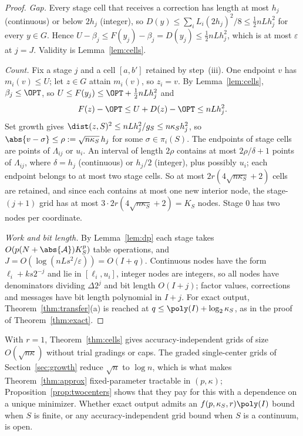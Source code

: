 \begin{proof}
\emph{Gap.} Every stage cell that receives a correction has length at most
$h_j$ (continuous) or below $2h_j$ (integer), so
$D(y)\le\sum_iL_i(2h_j)^2/8\le\frac12nLh_j^2$ for every $y\in G$. Hence
$U-\beta_j\le F(y_j)-\beta_j=D(y_j)\le\frac12nLh_j^2$, which is at most
$\varepsilon$ at $j=J$. Validity is Lemma~\ref{lem:cells}.

\emph{Count.} Fix a stage $j$ and a cell $[a,b']$ retained by step~(iii). One
endpoint $v$ has $m_i(v)\le U$; let $z\in G$ attain $m_i(v)$, so $z_i=v$.
By Lemma~\ref{lem:cells}, $\beta_j\le\OPT$, so
$U\le F(y_j)\le\OPT+\frac12nLh_j^2$ and
\[
F(z)-\OPT\le U+D(z)-\OPT\le nLh_j^2 .
\]
Set growth gives $\dist(z,S)^2\le nLh_j^2/g_S\le n\kappa_Sh_j^2$, so
$\abs{v-\sigma}\le\rho:=\sqrt{n\kappa_S}\,h_j$ for some $\sigma\in\pi_i(S)$.
The endpoints of stage cells are points of $\Lambda_{ij}$ or $u_i$. An
interval of length $2\rho$ contains at most $2\rho/\delta+1$ points of
$\Lambda_{ij}$, where $\delta=h_j$ (continuous) or $h_j/2$ (integer), plus
possibly $u_i$; each endpoint belongs to at most two stage cells. So at most
$2r(4\sqrt{n\kappa_S}+2)$ cells are retained, and since each contains at most
one new interior node, the stage-$(j+1)$ grid has at most
$3\cdot2r(4\sqrt{n\kappa_S}+2)=K_S$ nodes. Stage $0$ has two nodes per
coordinate.

\emph{Work and bit length.} By Lemma~\ref{lem:dp} each stage takes
$O(p(N+\abs{\mathcal A})K_S^p)$ table operations, and
$J=O(\log(nLs^2/\varepsilon))=O(I+q)$. Continuous nodes have the form
$\ell_i+ks2^{-j}$ and lie in $[\ell_i,u_i]$, integer nodes are integers, so
all nodes have denominators dividing $\Delta 2^j$ and bit length $O(I+j)$; factor
values, corrections and messages have bit length polynomial in $I+j$. For
exact output, Theorem~\ref{thm:transfer}(a) is reached at
$q\le\poly(I)+\log_2\kappa_S$, as in the proof of Theorem~\ref{thm:exact}.
\end{proof}

\begin{remark}\label{rem:grading}
With $r=1$, Theorem~\ref{thm:cells} gives accuracy-independent grids of
size $O(\sqrt{n\kappa})$ without trial gradings or caps. The graded
single-center grids of Section~\ref{sec:growth} reduce $\sqrt n$ to
$\log n$, which is what makes Theorem~\ref{thm:approx} fixed-parameter
tractable in $(p,\kappa)$; Proposition~\ref{prop:twocenters} shows that
they pay for this with a dependence on a unique minimizer. Whether exact
output admits an $f(p,\kappa_S,r)\poly(I)$ bound when $S$ is finite, or any
accuracy-independent grid bound when $S$ is a continuum, is open.
\end{remark}

